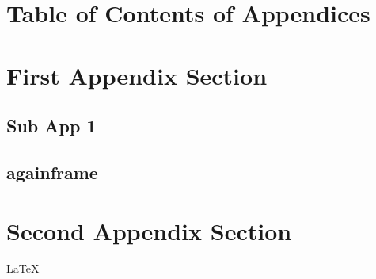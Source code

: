 \beginbackup
\appendix



\section*{Table of Contents of Appendices}

\begin{frame}{\secname}
    \tableofcontents[hideallsubsections,firstsection=3]
\end{frame}

\section{First Appendix Section}
\subsection{Sub App 1}

\begin{frame}{\subsecname}
\end{frame}

\subsection{againframe}

\section{Second Appendix Section}
\begin{frame}{\secname}
    \LaTeX
\end{frame}

\backupend
